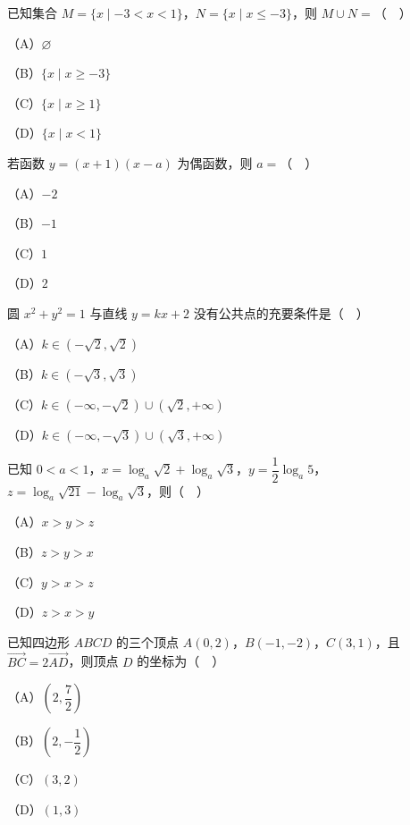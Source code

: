 


\begin{question}
已知集合 $M=\{x\mid -3<x<1\}$，$N=\{x\mid x\leqslant-3\}$，则 $M\cup N=$（　）

（A）$\varnothing$

（B）$\{x\mid x\geqslant-3\}$

（C）$\{x\mid x\geqslant1\}$

（D）$\{x\mid x<1\}$

\end{question}
\begin{question}
若函数 $y=(x+1)(x-a)$ 为偶函数，则 $a=$（　）

（A）$-2$

（B）$-1$

（C）$1$

（D）$2$

\end{question}
\begin{question}
圆 $x^2+y^2=1$ 与直线 $y=kx+2$ 没有公共点的充要条件是（　）

（A）$k\in(-\sqrt2,\sqrt2)$

（B）$k\in(-\sqrt3,\sqrt3)$

（C）$k\in(-\infty,-\sqrt2)\cup(\sqrt2,+\infty)$

（D）$k\in(-\infty,-\sqrt3)\cup(\sqrt3,+\infty)$

\end{question}
\begin{question}
已知 $0<a<1$，$x=\log_a\sqrt2+\log_a\sqrt3$，$y=\dfrac12\log_a5$，$z=\log_a\sqrt{21}-\log_a\sqrt3$，则（　）

（A）$x>y>z$

（B）$z>y>x$

（C）$y>x>z$

（D）$z>x>y$

\end{question}
\begin{question}
已知四边形 $ABCD$ 的三个顶点 $A(0,2)$，$B(-1,-2)$，$C(3,1)$，且 $\overrightarrow{BC}=2\overrightarrow{AD}$，则顶点 $D$ 的坐标为（　）

（A）$\left(2,\dfrac72\right)$

（B）$\left(2,-\dfrac12\right)$

（C）$(3,2)$

（D）$(1,3)$

\end{question}
